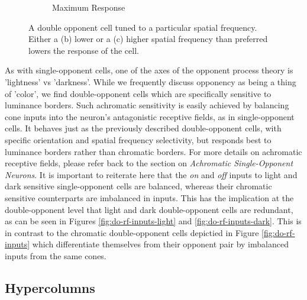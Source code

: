\documentclass[journal,onecolumn]{IEEEtran}
\begin{document}
\begin{figure}[H]
\begin{subfigure}{0.2\textwidth}
        \caption{Maximum Response}
    \end{subfigure}%
    \caption{A double opponent cell tuned to a particular spatial frequency. Either a (b) lower or a (c) higher spatial frequency than preferred lowers the response of the cell.} \label{fig:do-scale}
\end{figure}

As with single-opponent cells, one of the axes of the opponent process theory is 'lightness' vs 'darkness'. While we frequently discuss opponency as being a thing of 'color', we find double-opponent cells which are specifically sensitive to luminance borders.
Such achromatic sensitivity is easily achieved by balancing cone inputs into the neuron's antagonistic receptive fields, as in single-opponent cells. It behaves just as the previously described double-opponent cells, with specific orientation and spatial frequency selectivity, but responds best to luminance borders rather than chromatic borders. For more details on achromatic receptive fields, please refer back to the section on \textit{Achromatic Single-Opponent Neurons}.
It is important to reiterate here that the \textit{on} and \textit{off} inputs to light and dark sensitive single-opponent cells are balanced, whereas their chromatic sensitive counterparts are imbalanced in inputs. This has the implication at the double-opponent level that light and dark double-opponent cells are redundant, as can be seen in Figures \ref{fig:do-rf-inputs-light} and \ref{fig:do-rf-inputs-dark}. This is in contrast to the chromatic double-opponent cells depictied in Figure \ref{fig:do-rf-inputs} which differentiate themselves from their opponent pair by imbalanced inputs from the same cones.


\subsection*{Hypercolumns}
\end{document}
